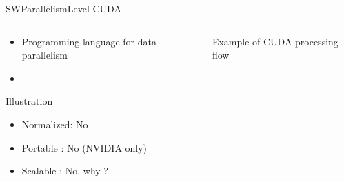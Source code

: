 %
\begin{Frame}{SWParallelismLevel CUDA}
  \begin{columns}[t]
    \begin{column}{\HW} %
      \begin{block}{}
        \begin{itemize}
        \item Programming language for data parallelism
        \item \href{https://en.wikipedia.org/wiki/CUDA}{}
        \end{itemize}
      \end{block} 
      \begin{alertblock}{Illustration}
        \begin{itemize}
        \item Normalized: No 
        \item Portable : No (NVIDIA only)
        \item Scalable : No, why ?
        \end{itemize}

      \end{alertblock}   
    \end{column}
    
    \begin{column}{\HW} %
      \begin{block}{Example of CUDA processing flow }
      \end{block}
    \end{column}
  \end{columns}  
\end{Frame}


